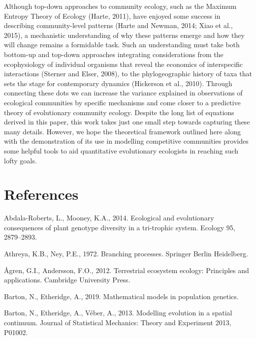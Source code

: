 \documentclass[]{elsarticle} %
\begin{document}
Although top-down approaches to community ecology, such as the Maximum
Entropy Theory of Ecology (Harte, 2011), have enjoyed some success in
describing community-level patterns (Harte and Newman, 2014; Xiao et
al., 2015), a mechanistic understanding of why these patterns emerge and
how they will change remains a formidable task. Such an understanding
must take both bottom-up and top-down approaches integrating
considerations from the ecophysiology of individual organisms that
reveal the economics of interspecific interactions (Sterner and Elser,
2008), to the phylogeographic history of taxa that sets the stage for
contemporary dynamics (Hickerson et al., 2010). Through connecting these
dots we can increase the variance explained in observations of
ecological communities by specific mechanisms and come closer to a
predictive theory of evolutionary community ecology. Despite the long
list of equations derived in this paper, this work takes just one small
step towards capturing these many details. However, we hope the
theoretical framework outlined here along with the demonstration of its
use in modelling competitive communities provides some helpful tools to
aid quantitative evolutionary ecologists in reaching such lofty goals.

\hypertarget{references}{%
\section*{References}\label{references}}

\hypertarget{refs}{}
\leavevmode\hypertarget{ref-AbdalaRoberts2014}{}%
Abdala-Roberts, L., Mooney, K.A., 2014. Ecological and evolutionary
consequences of plant genotype diversity in a tri-trophic system.
Ecology 95, 2879--2893.

\leavevmode\hypertarget{ref-Athreya1972}{}%
Athreya, K.B., Ney, P.E., 1972. Branching processes. Springer Berlin
Heidelberg.

\leavevmode\hypertarget{ref-9781107648258}{}%
Ågren, G.I., Andersson, F.O., 2012. Terrestrial ecosystem ecology:
Principles and applications. Cambridge University Press.

\leavevmode\hypertarget{ref-Barton2019}{}%
Barton, N., Etheridge, A., 2019. Mathematical models in population
genetics.

\leavevmode\hypertarget{ref-Barton2013}{}%
Barton, N., Etheridge, A., Véber, A., 2013. Modelling evolution in a
spatial continuum. Journal of Statistical Mechanics: Theory and
Experiment 2013, P01002.
\end{document}
